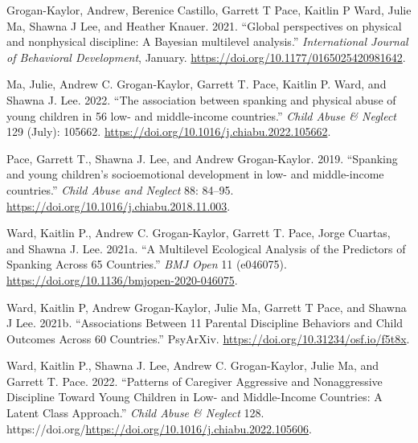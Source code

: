 \documentclass[
  letterpaper,
  DIV=11,
  numbers=noendperiod]{scrartcl}
\newlength{\cslhangindent}
\newlength{\cslentryspacingunit} %
\newenvironment{CSLReferences}[2] %
 {%
  \setlength{\parindent}{0pt}
  \ifodd #1
  \let\oldpar\par
  \def\par{\hangindent=\cslhangindent\oldpar}
  \fi
  \setlength{\parskip}{#2\cslentryspacingunit}
 }%
 {}
\begin{document}
\hypertarget{refs}{}
\begin{CSLReferences}{1}{0}
\leavevmode{}%
Grogan-Kaylor, Andrew, Berenice Castillo, Garrett T Pace, Kaitlin P
Ward, Julie Ma, Shawna J Lee, and Heather Knauer. 2021. {``{Global
perspectives on physical and nonphysical discipline: A Bayesian
multilevel analysis}.''} \emph{International Journal of Behavioral
Development}, January. \url{https://doi.org/10.1177/0165025420981642}.

\leavevmode{}%
Ma, Julie, Andrew C. Grogan-Kaylor, Garrett T. Pace, Kaitlin P. Ward,
and Shawna J. Lee. 2022. {``{The association between spanking and
physical abuse of young children in 56 low- and middle-income
countries}.''} \emph{Child Abuse \& Neglect} 129 (July): 105662.
\url{https://doi.org/10.1016/j.chiabu.2022.105662}.

\leavevmode{}%
Pace, Garrett T., Shawna J. Lee, and Andrew Grogan-Kaylor. 2019.
{``{Spanking and young children's socioemotional development in low- and
middle-income countries}.''} \emph{Child Abuse and Neglect} 88: 84--95.
\url{https://doi.org/10.1016/j.chiabu.2018.11.003}.

\leavevmode{}%
Ward, Kaitlin P., Andrew C. Grogan-Kaylor, Garrett T. Pace, Jorge
Cuartas, and Shawna J. Lee. 2021a. {``{A Multilevel Ecological Analysis
of the Predictors of Spanking Across 65 Countries}.''} \emph{BMJ Open}
11 (e046075). \url{https://doi.org/10.1136/bmjopen-2020-046075}.

\leavevmode{}%
Ward, Kaitlin P, Andrew Grogan-Kaylor, Julie Ma, Garrett T Pace, and
Shawna J Lee. 2021b. {``Associations Between 11 Parental Discipline
Behaviors and Child Outcomes Across 60 Countries.''} PsyArXiv.
\url{https://doi.org/10.31234/osf.io/f5t8x}.

\leavevmode{}%
Ward, Kaitlin P., Shawna J. Lee, Andrew C. Grogan-Kaylor, Julie Ma, and
Garrett T. Pace. 2022. {``{Patterns of Caregiver Aggressive and
Nonaggressive Discipline Toward Young Children in Low- and Middle-Income
Countries: A Latent Class Approach}.''} \emph{Child Abuse \& Neglect}
128. https://doi.org/\url{https://doi.org/10.1016/j.chiabu.2022.105606}.

\end{CSLReferences}
\end{document}
